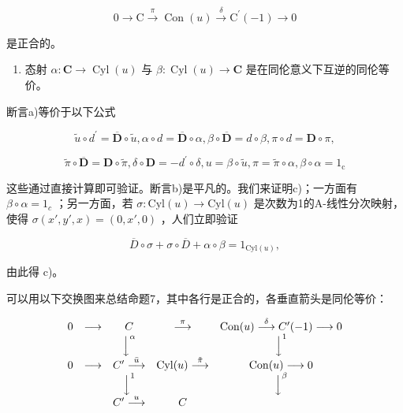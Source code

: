 \[
0 \rightarrow \mathrm{C} \xrightarrow {\pi} \operatorname{Con} (u) \xrightarrow {\delta} \mathrm{C} ^ {\prime} (- 1) \rightarrow 0
\]

是正合的。

\begin{enumerate}
\def\labelenumi{\alph{enumi})}
\setcounter{enumi}{2}
\tightlist
\item
  态射 \(\alpha : \mathbf{C} \to \operatorname{Cyl}(u)\) 与 \(\beta : \operatorname{Cyl}(u) \to \mathbf{C}\) 是在同伦意义下互逆的同伦等价。
\end{enumerate}

断言a)等价于以下公式

\[
\tilde {u} \circ d ^ {\prime} = \overline {{\mathbf {D}}} \circ \tilde {u}, \alpha \circ d = \overline {{\mathbf {D}}} \circ \alpha , \beta \circ \overline {{\mathbf {D}}} = d \circ \beta , \pi \circ d = \mathbf {D} \circ \pi ,
\]

\[
\tilde {\pi} \circ \overline {{\mathbf {D}}} = \mathbf {D} \circ \tilde {\pi}, \delta \circ \mathbf {D} = - d ^ {\prime} \circ \delta , u = \beta \circ \tilde {u}, \pi = \tilde {\pi} \circ \alpha , \beta \circ \alpha = 1 _ {\mathrm{c}}
\]

这些通过直接计算即可验证。断言b)是平凡的。我们来证明c)；一方面有 \(\beta \circ \alpha = 1_{c}\) ；另一方面，若 \(\sigma: \text{Cyl}(u) \to \text{Cyl}(u)\) 是次数为1的A-线性分次映射，使得 \(\sigma(x', y', x) = (0, x', 0)\) ，人们立即验证

\[
\overline {{{D}}} \circ \sigma + \sigma \circ \overline {{{D}}} + \alpha \circ \beta = 1 _ {\mathrm{Cyl} (u)},
\]

由此得 c)。

可以用以下交换图来总结命题7，其中各行是正合的，各垂直箭头是同伦等价：

\[
\begin{array}{c c c c c} 0 & \longrightarrow & C & \stackrel {{\pi}} {{\longrightarrow}} & \operatorname{Con} (u) \stackrel {{\delta}} {{\longrightarrow}} C ^ {\prime} (- 1) \longrightarrow 0 \\ & & \Big \downarrow^ {\alpha} & & \Big \downarrow^ {1} \\ 0 & \longrightarrow & C ^ {\prime} \stackrel {{\bar {u}}} {{\longrightarrow}} & \operatorname{Cyl} (u) \stackrel {{\tilde {\pi}}} {{\longrightarrow}} & \operatorname{Con} (u) \longrightarrow 0 \\ & & \Big \downarrow^ {1} & & \Big \downarrow^ {\beta} \\ & & C ^ {\prime} \stackrel {{u}} {{\longrightarrow}} & C \end{array}
\]

